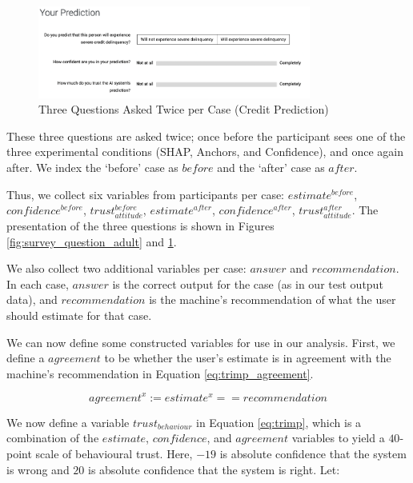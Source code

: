 \begin{figure}[htbp]
    \centering
    \includegraphics[width=0.8\textwidth]{figures/misleading_explanations/survey_question_credit.png}
    \caption{Three Questions Asked Twice per Case (Credit Prediction)}
    \label{fig:survey_question_credit}
\end{figure}

These three questions are asked twice; once before the participant sees one of the three experimental conditions (SHAP, Anchors, and Confidence), and once again after. We index the `before' case as $before$ and the `after' case as $after$. 

Thus, we collect six variables from participants per case: $estimate^{before}$, $confidence^{before}$, $trust_{attitude}^{before}$, $estimate^{after}$, $confidence^{after}$, $trust_{attitude}^{after}$. The presentation of the three questions is shown in Figures \ref{fig:survey_question_adult} and \ref{fig:survey_question_credit}.

We also collect two additional variables per case: $answer$ and $recommendation$. In each case, $answer$ is the correct output for the case (as in our test output data), and $recommendation$ is the machine's recommendation of what the user should estimate for that case. 

We can now define some constructed variables for use in our analysis. First, we define a $agreement$ to be whether the user's estimate is in agreement with the machine's recommendation in Equation \ref{eq:trimp_agreement}. 

\begin{equation}
    agreement^x := estimate^x == recommendation
    \label{eq:trimp_agreement}
\end{equation}

We now define a variable $trust_{behaviour}$ in Equation \ref{eq:trimp}, which is a combination of the $estimate$, $confidence$, and $agreement$ variables to yield a $40$-point scale of behavioural trust. Here, $-19$ is absolute confidence that the system is wrong and $20$ is absolute confidence that the system is right. Let:

